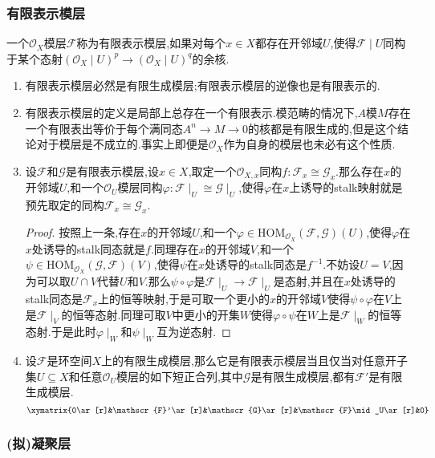 \subsubsection{有限表示模层}

一个$\mathscr{O}_X$模层$\mathscr{F}$称为有限表示模层,如果对每个$x\in X$都存在开邻域$U$,使得$\mathscr{F}\mid U$同构于某个态射$(\mathscr{O}_X\mid U)^p\to(\mathscr{O}_X\mid U)^q$的余核.
\begin{enumerate}
	\item 有限表示模层必然是有限生成模层;有限表示模层的逆像也是有限表示的.
	\item 有限表示模层的定义是局部上总存在一个有限表示.模范畴的情况下,$A$模$M$存在一个有限表出等价于每个满同态$A^n\to M\to0$的核都是有限生成的,但是这个结论对于模层是不成立的.事实上即便是$\mathscr{O}_X$作为自身的模层也未必有这个性质.
	\item 设$\mathscr{F}$和$\mathscr{G}$是有限表示模层,设$x\in X$,取定一个$\mathscr{O}_{X,x}$同构$f:\mathscr{F}_x\cong\mathscr{G}_x$.那么存在$x$的开邻域$U$,和一个$\mathscr{O}_U$模层同构$\varphi:\mathscr{F}\mid_U\cong\mathscr{G}\mid_U$,使得$\varphi$在$x$上诱导的stalk映射就是预先取定的同构$\mathscr{F}_x\cong\mathscr{G}_x$.
	\begin{proof}
		
		按照上一条,存在$x$的开邻域$U$,和一个$\varphi\in\mathrm{HOM}_{\mathscr{O}_X}(\mathscr{F},\mathscr{G})(U)$,使得$\varphi$在$x$处诱导的stalk同态就是$f$.同理存在$x$的开邻域$V$,和一个$\psi\in\mathrm{HOM}_{\mathscr{O}_X}(\mathscr{G},\mathscr{F})(V)$,使得$\psi$在$x$处诱导的stalk同态是$f^{-1}$.不妨设$U=V$,因为可以取$U\cap V$代替$U$和$V$.那么$\psi\circ\varphi$是$\mathscr{F}\mid_U\to\mathscr{F}\mid_U$是态射,并且在$x$处诱导的stalk同态是$\mathscr{F}_x$上的恒等映射,于是可取一个更小的$x$的开邻域$V$使得$\psi\circ\varphi$在$V$上是$\mathscr{F}\mid_V$的恒等态射.同理可取$V$中更小的开集$W$使得$\varphi\circ\psi$在$W$上是$\mathscr{F}\mid_W$的恒等态射.于是此时$\varphi\mid_W$和$\psi\mid_W$互为逆态射.
	\end{proof}
	\item 设$\mathscr{F}$是环空间$X$上的有限生成模层,那么它是有限表示模层当且仅当对任意开子集$U\subseteq X$和任意$\mathscr{O}_U$模层的如下短正合列,其中$\mathscr{G}$是有限生成模层,都有$\mathscr{F}'$是有限生成模层.
	$$\xymatrix{0\ar[r]&\mathscr{F}'\ar[r]&\mathscr{G}\ar[r]&\mathscr{F}\mid_U\ar[r]&0}$$
\end{enumerate}
\subsubsection{(拟)凝聚层}


